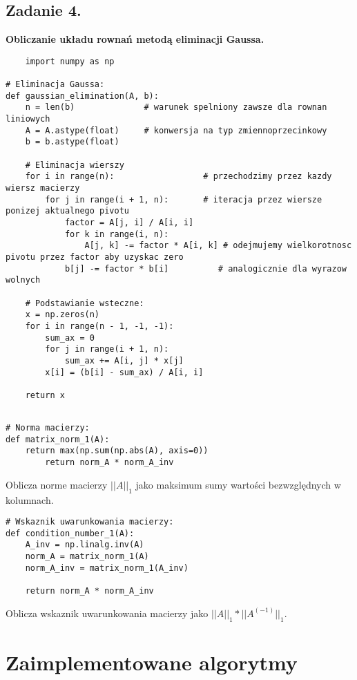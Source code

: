 \documentclass{article}
\begin{document}
\subsection{Zadanie 4.}
\textbf{Obliczanie układu rownań metodą eliminacji Gaussa.}
\begin{lstlisting}
    import numpy as np

# Eliminacja Gaussa:
def gaussian_elimination(A, b):
    n = len(b)              # warunek spelniony zawsze dla rownan liniowych 
    A = A.astype(float)     # konwersja na typ zmiennoprzecinkowy
    b = b.astype(float)

    # Eliminacja wierszy
    for i in range(n):                  # przechodzimy przez kazdy wiersz macierzy              
        for j in range(i + 1, n):       # iteracja przez wiersze ponizej aktualnego pivotu
            factor = A[j, i] / A[i, i]  
            for k in range(i, n):       
                A[j, k] -= factor * A[i, k] # odejmujemy wielkorotnosc pivotu przez factor aby uzyskac zero 
            b[j] -= factor * b[i]          # analogicznie dla wyrazow wolnych 

    # Podstawianie wsteczne:
    x = np.zeros(n)                         
    for i in range(n - 1, -1, -1):          
        sum_ax = 0
        for j in range(i + 1, n):           
            sum_ax += A[i, j] * x[j]
        x[i] = (b[i] - sum_ax) / A[i, i]    

    return x
\end{lstlisting}

\begin{lstlisting}
    
# Norma macierzy:
def matrix_norm_1(A):
    return max(np.sum(np.abs(A), axis=0))  
        return norm_A * norm_A_inv
\end{lstlisting}
    Oblicza norme macierzy $||A||_1$ jako maksimum sumy wartości bezwzględnych w kolumnach.
\begin{lstlisting}
# Wskaznik uwarunkowania macierzy:
def condition_number_1(A):
    A_inv = np.linalg.inv(A)  
    norm_A = matrix_norm_1(A)  
    norm_A_inv = matrix_norm_1(A_inv)  

    return norm_A * norm_A_inv
\end{lstlisting}

Oblicza wskaznik uwarunkowania macierzy jako $||A||_1 * ||A^(-1)||_1$.

\section{Zaimplementowane algorytmy}
\end{document}
